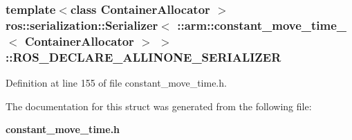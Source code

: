 \subsubsection[{\-R\-O\-S\-\_\-\-D\-E\-C\-L\-A\-R\-E\-\_\-\-A\-L\-L\-I\-N\-O\-N\-E\-\_\-\-S\-E\-R\-I\-A\-L\-I\-Z\-E\-R}]{\setlength{\rightskip}{0pt plus 5cm}template$<$class Container\-Allocator $>$ ros\-::serialization\-::\-Serializer$<$ \-::{\bf arm\-::constant\-\_\-move\-\_\-time\-\_\-}$<$ \-Container\-Allocator $>$ $>$\-::{\bf \-R\-O\-S\-\_\-\-D\-E\-C\-L\-A\-R\-E\-\_\-\-A\-L\-L\-I\-N\-O\-N\-E\-\_\-\-S\-E\-R\-I\-A\-L\-I\-Z\-E\-R}}\label{structros_1_1serialization_1_1Serializer_3_01_1_1arm_1_1constant__move__time___3_01ContainerAllocator_01_4_01_4_aef5e5ebdad67e10c92d015891820b941}


\-Definition at line 155 of file constant\-\_\-move\-\_\-time.\-h.



\-The documentation for this struct was generated from the following file\-:\begin{DoxyCompactItemize}
\item 
{\bf constant\-\_\-move\-\_\-time.\-h}\end{DoxyCompactItemize}

